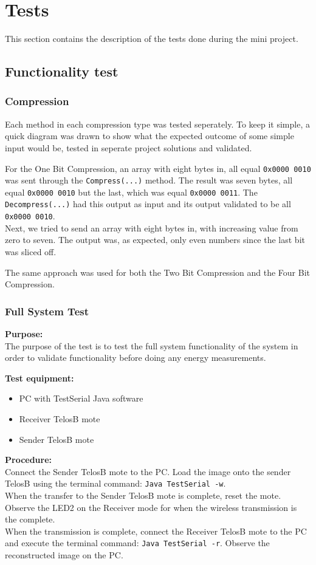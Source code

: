 \section{Tests}
This section contains the description of the tests done during the mini project.
\subsection{Functionality test}
\subsubsection{Compression}
Each method in each compression type was tested seperately.
To keep it simple, a quick diagram was drawn to show what the expected outcome of some simple input would be, tested in seperate project solutions and validated.

For the One Bit Compression, an array with eight bytes in, all equal \texttt{0x0000 0010} was sent through the \texttt{Compress(...)} method.
The result was seven bytes, all equal \texttt{0x0000 0010} but the last, which was equal \texttt{0x0000 0011}.
The \texttt{Decompress(...)} had this output as input and its output validated to be all \texttt{0x0000 0010}.
\\
Next, we tried to send an array with eight bytes in, with increasing value from zero to seven. 
The output was, as expected, only even numbers since the last bit was sliced off.

The same approach was used for both the Two Bit Compression and the Four Bit Compression.

\subsubsection{Full System Test}
\textbf{Purpose:}\\
The purpose of the test is to test the full system functionality of the system in order to validate functionality before doing any energy measurements.

\textbf{Test equipment:}
\begin{itemize}
\item PC with TestSerial Java software
\item Receiver TelosB mote
\item Sender TelosB mote
\end{itemize}

\textbf{Procedure:}\\
Connect the Sender TelosB mote to the PC. Load the image onto the sender TelosB using the terminal command: \texttt{Java TestSerial -w}.\\
When the transfer to the Sender TelosB mote is complete, reset the mote. Observe the LED2 on the Receiver mode for when the wireless transmission is the complete.\\
When the transmission is complete, connect the Receiver TelosB mote to the PC and execute the terminal command: \texttt{Java TestSerial -r}. Observe the reconstructed image on the PC.

